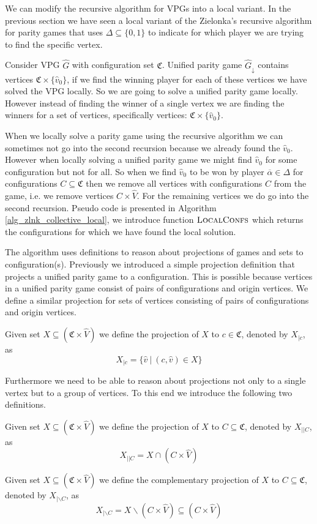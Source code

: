 We can modify the recursive algorithm for VPGs into a local variant. In the previous section we have seen a local variant of the Zielonka's recursive algorithm for parity games that uses $\Delta \subseteq \{0,1\}$ to indicate for which player we are trying to find the specific vertex.

Consider VPG $\hat{G}$ with configuration set $\mathfrak{C}$. Unified parity game $\hat{G}_{\downarrow}$ contains vertices $\mathfrak{C} \times \{\hat{v}_0\}$, if we find the winning player for each of these vertices we have solved the VPG locally. So we are going to solve a unified parity game locally. However instead of finding the winner of a single vertex we are finding the winners for a set of vertices, specifically vertices: $\mathfrak{C} \times \{\hat{v}_0\}$.

When we locally solve a parity game using the recursive algorithm we can sometimes not go into the second recursion because we already found the $\hat{v}_0$. However when locally solving a unified parity game we might find $\hat{v}_0$ for some configuration but not for all. So when we find $\hat{v}_0$ to be won by player $\overline{\alpha} \in \Delta$ for configurations $C \subseteq \mathfrak{C}$ then we remove all vertices with configurations $C$ from the game, i.e. we remove vertices $C \times \hat{V}$. For the remaining vertices we do go into the second recursion. Pseudo code is presented in Algorithm \ref{alg_zlnk_collective_local}, we introduce function $\textsc{LocalConfs}$ which returns the configurations for which we have found the local solution.

The algorithm uses definitions to reason about projections of games and sets to configuration(s). Previously we introduced a simple projection definition that projects a unified parity game to a configuration. This is possible because vertices in a unified parity game consist of pairs of configurations and origin vertices. We define a similar projection for sets of vertices consisting of pairs of configurations and origin vertices.
\begin{definition}
	Given set $X \subseteq (\mathfrak{C} \times \hat{V})$ we define the projection of $X$ to $c \in \mathfrak{C}$, denoted by $X_{|c}$, as
	\[ X_{|c} = \{ \hat{v}\ |\ (c,\hat{v}) \in X \} \]
\end{definition}
Furthermore we need to be able to reason about projections not only to a single vertex but to a group of vertices. To this end we introduce the following two definitions.
\begin{definition}
	Given set $X \subseteq (\mathfrak{C} \times \hat{V})$ we define the projection of $X$ to $C \subseteq \mathfrak{C}$, denoted by $X_{||C}$, as
	\[ X_{||C} = X \cap (C \times \hat{V}) \]
\end{definition}
\begin{definition}
Given set $X \subseteq (\mathfrak{C} \times \hat{V})$ we define the complementary projection of $X$ to $C \subseteq \mathfrak{C}$, denoted by $X_{|\backslash C}$, as
\[ X_{|\backslash C} = X \backslash (C \times \hat{V}) \subseteq (C \times \hat{V}) \]
\end{definition}

